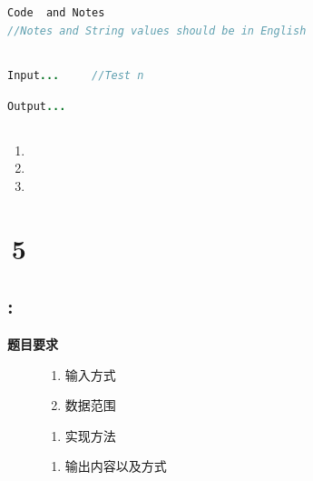 \documentclass{article}
\begin{document}
\subsection{}
\begin{center}
	\begin{lstlisting}[language = Java]
Code  and Notes        
//Notes and String values should be in English
	\end{lstlisting}
\end{center}


\subsection{}
\begin{center}
	\begin{lstlisting}[language = Java]
Input...     //Test n
	\end{lstlisting}
\end{center}

\begin{center}
\begin{lstlisting}[language = Java]
Output...
\end{lstlisting}
\end{center}
\subsection{}
\begin{enumerate}
	\item\kaishu
	\item\kaishu
	\item\kaishu
\end{enumerate}
\newpage


\section{\,5}

\subsection{:}
\noindent\kaishu \textbf{题目要求}
\begin{description}
	\item [\kaishu输入]
	\begin{enumerate}
		\item \kaishu 输入方式
		\item \kaishu 数据范围
	\end{enumerate}
	\item [\kaishu实现]
	\begin{enumerate}
		\item 实现方法
		\end{enumerate}
	\item [\kaishu输出]
	\begin{enumerate}
		\item []\kaishu 输出内容以及方式
	\end{enumerate}
\end{description}
\end{document}
